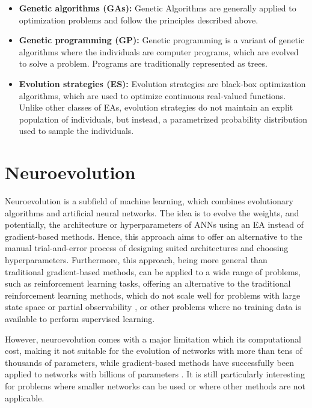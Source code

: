 \begin{itemize}
    \item \textbf{Genetic algorithms (GAs):} Genetic Algorithms \cite{genetic_alg,genetic_alg_review} are generally applied to optimization problems and follow the principles described above.
    \item \textbf{Genetic programming (GP):} Genetic programming \cite{cartesian_gp} is a variant of genetic algorithms where the individuals are computer programs, which are evolved to
        solve a problem. Programs are traditionally represented as trees.
    \item \textbf{Evolution strategies (ES):} Evolution strategies \cite{es_intro} are black-box optimization algorithms, which are used to optimize continuous real-valued functions.
        Unlike other classes of EAs, evolution strategies do not maintain an explit population of individuals, but instead, a parametrized probability distribution
        used to sample the individuals.
\end{itemize}

\section{Neuroevolution}

Neuroevolution is a subfield of machine learning, which combines evolutionary algorithms and artificial neural networks. The idea is to evolve the weights,
and potentially, the architecture or hyperparameters of ANNs using an EA instead of gradient-based methods. Hence, this approach aims to
offer an alternative to the manual trial-and-error process of designing suited architectures and choosing hyperparameters. Furthermore, this approach,
being more general than traditional gradient-based methods, can be applied to a wide range of problems, such as reinforcement learning tasks, offering an
alternative to the traditional reinforcement learning methods, which do not scale well for problems with large state space or partial observability
\cite{challenges_of_rl,rl_control}, or other problems where no training data is available to perform supervised learning.

However, neuroevolution comes with a major limitation which its computational cost, making it not suitable for the evolution of networks with more than
tens of thousands of parameters, while gradient-based methods have successfully been applied to networks with billions of parameters \cite{llama3}.
It is still particularly interesting for problems where smaller networks can be used or where other methods are not applicable.

